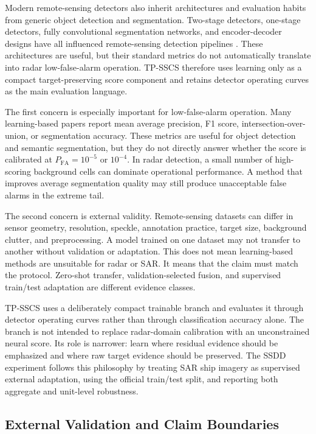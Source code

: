 \documentclass[journal]{IEEEtran}
\begin{document}
Modern remote-sensing detectors also inherit architectures and evaluation habits from generic object detection and segmentation. Two-stage detectors, one-stage detectors, fully convolutional segmentation networks, and encoder-decoder designs have all influenced remote-sensing detection pipelines \cite{ren2017fasterrcnn,redmon2016yolo,shelhamer2017fcn,ronneberger2015unet,liu2020objectsurvey}. These architectures are useful, but their standard metrics do not automatically translate into radar low-false-alarm operation. TP-SSCS therefore uses learning only as a compact target-preserving score component and retains detector operating curves as the main evaluation language.

The first concern is especially important for low-false-alarm operation. Many learning-based papers report mean average precision, F1 score, intersection-over-union, or segmentation accuracy. These metrics are useful for object detection and semantic segmentation, but they do not directly answer whether the score is calibrated at $P_{\mathrm{FA}}=10^{-5}$ or $10^{-4}$. In radar detection, a small number of high-scoring background cells can dominate operational performance. A method that improves average segmentation quality may still produce unacceptable false alarms in the extreme tail.

The second concern is external validity. Remote-sensing datasets can differ in sensor geometry, resolution, speckle, annotation practice, target size, background clutter, and preprocessing. A model trained on one dataset may not transfer to another without validation or adaptation. This does not mean learning-based methods are unsuitable for radar or SAR. It means that the claim must match the protocol. Zero-shot transfer, validation-selected fusion, and supervised train/test adaptation are different evidence classes.

TP-SSCS uses a deliberately compact trainable branch and evaluates it through detector operating curves rather than through classification accuracy alone. The branch is not intended to replace radar-domain calibration with an unconstrained neural score. Its role is narrower: learn where residual evidence should be emphasized and where raw target evidence should be preserved. The SSDD experiment follows this philosophy by treating SAR ship imagery as supervised external adaptation, using the official train/test split, and reporting both aggregate and unit-level robustness.

\subsection{External Validation and Claim Boundaries}
\end{document}
